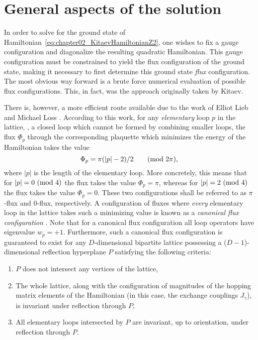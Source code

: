 %
%
\section{General aspects of the solution}
\label{section:chapter02_GeneralAspects}
%
%
In order to solve for the ground state of Hamiltonian~\eqref{eq:chapter02_KitaevHamiltonianZ2}, one wishes to fix a gauge configuration and diagonalize the resulting quadratic Hamiltonian.
This gauge configuration must be constrained to yield the flux configuration of the ground state, making it necessary to first determine this ground state \textit{flux} configuration.
The most obvious way forward is a brute force numerical evaluation of possible flux configurations.
This, in fact, was the approach originally taken by Kitaev.

There is, however, a more efficient route available due to the work of Elliot Lieb and Michael Loss \cite{LiebHPA1992, LiebDMJ1993,LiebPRL1994,MacrisJSP1996}.
According to this work, for any \textit{elementary} loop $p$ in the lattice, \ie, a closed loop which cannot be formed by combining smaller loops, the flux $\Phi_p$ through the corresponding plaquette which minimizes the energy of the Hamiltonian takes the value
%
\begin{equation}
	\Phi_p = \pi(|p|-2)/2 \qquad ({\rm mod}~2\pi),
\end{equation}
%
where $|p|$ is the length of the elementary loop.
More concretely, this means that for $|p| = 0~({\rm mod}~4)$ the flux takes the value $\Phi_p = \pi$, whereas for $|p| = 2~({\rm mod}~4)$ the flux takes the value  $\Phi_p = 0$.
These two configurations shall be referred to as $\pi$-flux and $0$-flux, respectively.
A configuration of fluxes where \textit{every} elementary loop in the lattice takes such a minimizing value is known as a \textit{canonical flux configuration} \cite{MacrisJSP1996}.
Note that for a canonical flux configuration all loop operators have eigenvalue $w_p = +1$.
Furthermore, such a canonical flux configuration is guaranteed to exist for any $D$-dimensional bipartite lattice possessing a ($D-1$)-dimensional reflection hyperplane $P$ satisfying the following criteria:
%
\begin{enumerate}[label=(\alph*),leftmargin=3\parindent]
	\item $P$ does not intersect any vertices of the lattice,
	\item The whole lattice, along with the configuration of magnitudes of the hopping matrix elements of the Hamiltonian (in this case, the exchange couplings $J_{\gamma}$), is invariant under reflection through $P$,
	\item All elementary loops intersected by $P$ are invariant, up to orientation, under reflection through $P$.
\end{enumerate}
%

